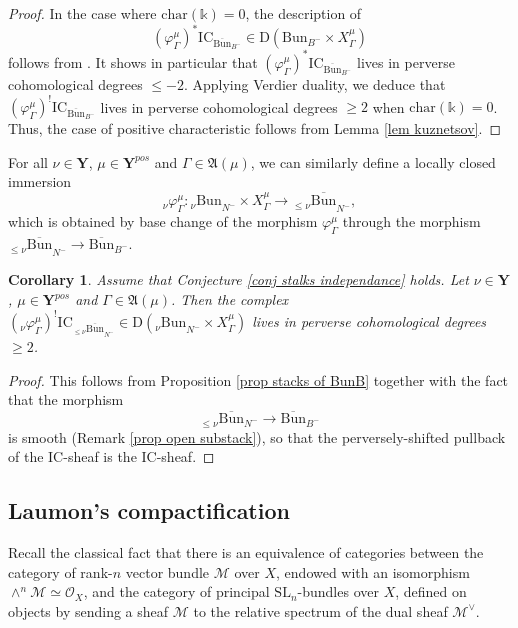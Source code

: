 \documentclass[11pt]{amsart}
\theoremstyle{plain}
\newtheorem{coro}[thm]{Corollary}
\theoremstyle{remark}
\numberwithin{equation}{section}
\begin{document}
	\begin{proof}
		In the case where $\mathrm{char}(\mathbb{k})=0$, the description of $$(\varphi_{\Gamma}^{\mu})^*\mathrm{IC}_{\overline{\mathrm{Bun}}_{B^-}}\in \mathrm{D}({\mathrm{Bun}}_{B^-}\times X_\Gamma^\mu)$$ 
  follows from \cite[Theorem 7.3]{BBGM}. It shows in particular that $(\varphi_{\Gamma}^{\mu})^*\mathrm{IC}_{\overline{\mathrm{Bun}}_{B^-}}$ lives in perverse cohomological degrees $\leq -2$. Applying Verdier duality, we deduce that $(\varphi_{\Gamma}^{\mu})^!\mathrm{IC}_{\overline{\mathrm{Bun}}_{B^-}}$ lives in perverse cohomological degrees $\geq2$ when $\mathrm{char}(\mathbb{k})=0$. Thus, the case of positive characteristic follows from Lemma \ref{lem kuznetsov}.
	\end{proof}
	For all $\nu\in\mathbf{Y}$, $\mu\in \mathbf{Y}^{pos}$ and $\Gamma\in\mathfrak{A}(\mu)$, we can similarly define a locally closed immersion
	$${_\nu\varphi^\mu_\Gamma}:{_{\nu}\mathrm{Bun}}_{N^-}\times X^\mu_\Gamma\to  {_{\leq\nu}\overline{\mathrm{Bun}}}_{N^-},$$
	which is obtained by base change of the morphism $\varphi^\mu_\Gamma$ through the morphism ${_{\leq\nu}\overline{\mathrm{Bun}}}_{N^-}\to {\overline{\mathrm{Bun}}}_{B^-}$.
		\begin{coro}\label{coro stalks}Assume that Conjecture \ref{conj stalks independance} holds. Let $\nu\in\mathbf{Y}$, $\mu\in \mathbf{Y}^{pos}$ and $\Gamma\in\mathfrak{A}(\mu)$. Then the complex $({_\nu\varphi_{\Gamma}^{\mu}})^!\mathrm{IC}_{{_{\leq\nu}\overline{\mathrm{Bun}}}_{N^-}}\in \mathrm{D}({_{\nu}\mathrm{Bun}}_{N^-}\times X_\Gamma^\mu)$ lives in perverse cohomological degrees $\geq2$.
		\end{coro}
		\begin{proof}
			This follows from Proposition \ref{prop stacks of BunB} together with the fact that the morphism 
   $$_{\leq\nu}\overline{\mathrm{Bun}}_{N^-}\to\overline{\mathrm{Bun}}_{B^-}$$ 
   is smooth (Remark \ref{prop open substack}), so that the perversely-shifted pullback of the IC-sheaf is the IC-sheaf. 
	\end{proof}
 
	\subsection{Laumon's compactification}\label{section Laumon} Recall the classical fact that there is an equivalence of categories between the category of rank-$n$ vector bundle $\mathcal{M}$ over $X$, endowed with an isomorphism $\wedge^n\mathcal{M}\simeq\mathcal{O}_X$, and the category of principal $\mathrm{SL}_n$-bundles over $X$, defined on objects by sending a sheaf $\mathcal{M}$ to the relative spectrum of the dual sheaf $\mathcal{M}^\vee$.
	
\end{document}
